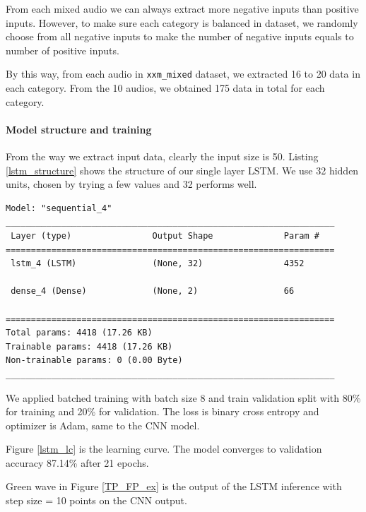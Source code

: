 \documentclass{article}
\begin{document}
    From each mixed audio we can always extract more negative inputs than positive inputs. However, to make sure each category is balanced in dataset, we  randomly choose from all negative inputs to make the number of negative inputs equals to number of positive inputs. 
    
    By this way, from each audio in \lstinline|xxm_mixed| dataset, we extracted 16 to 20 data in each category. From the 10 audios, we obtained 175 data in total for each category.

    \paragraph*{Model structure and training}
    From the way we extract input data, clearly the input size is 50.
    Listing \ref{lstm_structure} shows the structure of our single layer LSTM. We use 32 hidden units, chosen by trying a few values and 32 performs well. 
\begin{lstlisting}[caption={LSTM structure}, label={lstm_structure}]
Model: "sequential_4"
_________________________________________________________________
 Layer (type)                Output Shape              Param #   
=================================================================
 lstm_4 (LSTM)               (None, 32)                4352      
                                                                 
 dense_4 (Dense)             (None, 2)                 66        
                                                                 
=================================================================
Total params: 4418 (17.26 KB)
Trainable params: 4418 (17.26 KB)
Non-trainable params: 0 (0.00 Byte)
_________________________________________________________________
\end{lstlisting}

    We applied batched training with batch size 8 and train validation split with 80\% for training and 20\% for validation. The loss is binary cross entropy and optimizer is Adam, same to the CNN model.

    Figure \ref{lstm_lc} is the learning curve. The model converges to validation accuracy 87.14\% after 21 epochs.

    Green wave in Figure \ref{TP_FP_ex} is the output of the LSTM inference with step size = 10 points on the CNN output.
\end{document}
